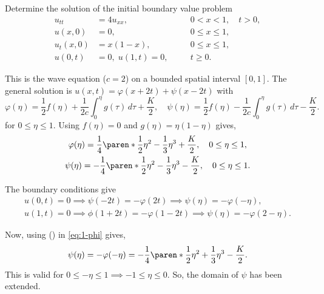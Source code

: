 \documentclass[11pt]{penrose}
\begin{document}
\clearpage
\begin{problem}{6}
    Determine the solution of the initial boundary value problem
    \begin{equation*}
        \begin{aligned}
            u_{tt} &= 4u_{xx}, & &0 < x < 1, \quad t > 0,\\
            u(x,0) &= 0, & &0 \leq x \leq 1,\\
            u_t(x,0) &= x(1-x), & &0 \leq x \leq 1,\\
            u(0,t) &= 0, \; u(1,t) = 0, & \quad &t \geq 0.
        \end{aligned}
    \end{equation*}
    
    \solution This is the wave equation ($c = 2$) on a bounded spatial interval $[0,1]$. The general solution is $u(x, t) = \varphi(x + 2t) + \psi(x - 2t)$ with
    \begin{equation*}
        \varphi(\eta) = \frac{1}{2} f(\eta) + \frac{1}{2c} \int_0^\eta g(\tau) \,d\tau + \frac{K}{2},
        \quad
        \psi(\eta) = \frac{1}{2} f(\eta) - \frac{1}{2c} \int_0^\eta g(\tau) \,d\tau - \frac{K}{2}.
    \end{equation*}
    for $0 \leq \eta \leq 1$. Using $f(\eta) = 0$ and $g(\eta) = \eta (1 - \eta)$ gives,
    \begin{gather}
        \varphi(\eta) = \frac{1}{4} \paren*{\frac{1}{2}\eta^2 - \frac{1}{3}\eta^3} + \frac{K}{2}, \quad 0 \leq \eta \leq 1, \label{eq:1-phi}\\
        \psi(\eta) = - \frac{1}{4} \paren*{\frac{1}{2}\eta^2 - \frac{1}{3}\eta^3} - \frac{K}{2}, \quad 0 \leq \eta \leq 1. \label{eq:1-psi}
    \end{gather}

    The boundary conditions give
    \begin{gather*}
        u(0,t) = 0 \implies \psi(-2t) = -\varphi(2t) \implies \psi(\eta) = -\varphi(-\eta), \tag{\textasteriskcentered}\\
        u(1,t) = 0 \implies \phi(1+2t) = -\varphi(1-2t) \implies \psi(\eta) = -\varphi(2-\eta). \tag{\textasteriskcentered\textasteriskcentered}
    \end{gather*}

    Now, using (\textasteriskcentered) in \eqref{eq:1-phi} gives,
    \begin{equation}
        \psi(\eta)
        = -\varphi(-\eta)
        = -\frac{1}{4} \paren*{\frac{1}{2}\eta^2 + \frac{1}{3}\eta^3} - \frac{K}{2}. \label{eq:2-psi}
    \end{equation}
    This is valid for $0 \leq -\eta \leq 1 \implies -1 \leq \eta \leq 0$. So, the domain of $\psi$ has been extended.


\end{problem}
\end{document}
